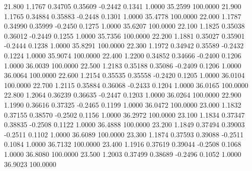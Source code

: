   21.800   1.1767   0.34705   0.35609  -0.2442   0.1341   1.0000  35.2599 100.0000
  21.900   1.1765   0.34884   0.35883  -0.2448   0.1301   1.0000  35.4778 100.0000
  22.000   1.1787   0.34990   0.35999  -0.2450   0.1275   1.0000  35.6207 100.0000
  22.100   1.1825   0.35038   0.36012  -0.2449   0.1255   1.0000  35.7356 100.0000
  22.200   1.1881   0.35027   0.35901  -0.2444   0.1238   1.0000  35.8291 100.0000
  22.300   1.1972   0.34942   0.35589  -0.2432   0.1224   1.0000  35.9074 100.0000
  22.400   1.2200   0.34852   0.34666  -0.2400   0.1206   1.0000  36.0039 100.0000
  22.500   1.2183   0.35188   0.35086  -0.2409   0.1206   1.0000  36.0064 100.0000
  22.600   1.2154   0.35535   0.35558  -0.2420   0.1205   1.0000  36.0104 100.0000
  22.700   1.2115   0.35884   0.36068  -0.2433   0.1204   1.0000  36.0165 100.0000
  22.800   1.2064   0.36239   0.36635  -0.2447   0.1203   1.0000  36.0264 100.0000
  22.900   1.1990   0.36616   0.37325  -0.2465   0.1199   1.0000  36.0472 100.0000
  23.000   1.1832   0.37155   0.38570  -0.2502   0.1156   1.0000  36.2972 100.0000
  23.100   1.1834   0.37347   0.38835  -0.2508   0.1122   1.0000  36.4888 100.0000
  23.200   1.1849   0.37494   0.39003  -0.2511   0.1102   1.0000  36.6089 100.0000
  23.300   1.1874   0.37593   0.39088  -0.2511   0.1084   1.0000  36.7132 100.0000
  23.400   1.1916   0.37619   0.39044  -0.2508   0.1068   1.0000  36.8080 100.0000
  23.500   1.2003   0.37499   0.38689  -0.2496   0.1052   1.0000  36.9023 100.0000
